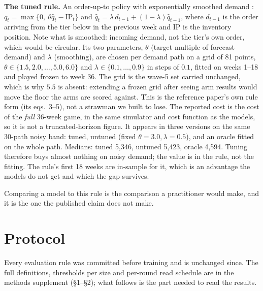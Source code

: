 \documentclass[11pt]{article}
\begin{document}
\textbf{The tuned rule.} An order-up-to policy with exponentially smoothed demand \cite{chen2000}:
$q_t=\max\{0,\ \theta\hat q_t-\mathrm{IP}_t\}$ and
$\hat q_t=\lambda\,d_{t-1}+(1-\lambda)\hat q_{t-1}$, where $d_{t-1}$ is the order arriving from the
tier below in the previous week and $\mathrm{IP}$ is the inventory position. Note what is smoothed:
incoming demand, not the tier's own order, which would be circular. Its two parameters, $\theta$
(target multiple of forecast demand) and $\lambda$ (smoothing), are chosen per demand path on a grid of
81 points, $\theta\in\{1.5,2.0,\dots,5.0,6.0\}$ and $\lambda\in\{0.1,\dots,0.9\}$ in steps of $0.1$, fitted on
weeks 1--18 and played frozen to week 36. The grid is the wave-5 set carried unchanged, which is why
$5.5$ is absent: extending a frozen grid after seeing arm results would move the floor the arms are
scored against.
This is the reference paper's own rule form (its eqs.~3--5), not a strawman we built to lose. The reported
cost is the cost of the \emph{full} 36-week game, in the same simulator and cost function as the
models, so it is not a truncated-horizon figure. It appears in three versions on the same 30-path
noisy band: tuned, untuned (fixed $\theta{=}3.0,\lambda{=}0.5$), and an oracle fitted on the whole
path. Medians: tuned 5{,}346, untuned 5{,}423, oracle 4{,}594. Tuning therefore buys almost nothing on
noisy demand; the value is in the rule, not the fitting. The rule's first 18 weeks are in-sample for
it, which is an advantage the models do not get and which the gap survives.

Comparing a model to this rule is the comparison a practitioner would make, and it is the one the
published claim does not make.

\section{Protocol}\label{sec:protocol}

Every evaluation rule was committed before training and is unchanged since. The full definitions,
thresholds per size and per-round read schedule are in the methods supplement \cite{supplement}
(\S1--\S2); what follows is the part needed to read the results.
\end{document}
